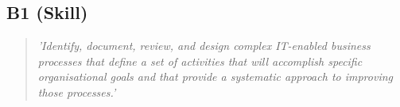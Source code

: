 \subsection{B1 (Skill)}

  \begin{quote}
    \textit{'Identify, document, review, and design
    complex IT-enabled business processes that define a set
    of activities that will accomplish specific organisational
    goals and that provide a systematic approach to improving
    those processes.'}
  \end{quote}

\newpage
